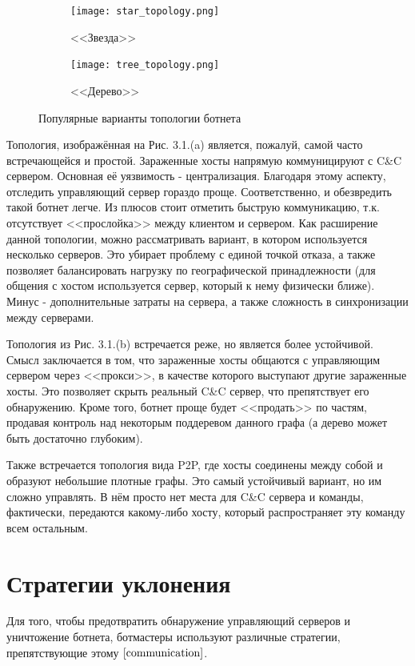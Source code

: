 \documentclass[14pt]{extreport} %
\begin{document}
\begin{figure}[H]
			
	\begin{subfigure}{0.5\textwidth}
		\texttt{[image: star\_topology.png]}
		\caption{<<Звезда>>}
		\label{fig:subim1}
	\end{subfigure}
	\begin{subfigure}{0.5\textwidth}
		\texttt{[image: tree\_topology.png]}
		\caption{<<Дерево>>}
		\label{fig:subim2}
	\end{subfigure}
			 
	\caption{Популярные варианты топологии ботнета}
	\label{fig:image2}
\end{figure}
Топология, изображённая на Рис. 3.1.(a) является, пожалуй, самой часто встречающейся и простой. Зараженные хосты напрямую коммуницируют с C\&C сервером. Основная её уязвимость - централизация. Благодаря этому аспекту, отследить управляющий сервер гораздо проще. Соответственно, и обезвредить такой ботнет легче. Из плюсов стоит отметить быструю коммуникацию, т.к. отсутствует <<прослойка>> между клиентом и сервером.
Как расширение данной топологии, можно рассматривать вариант, в котором используется несколько серверов. Это убирает проблему с единой точкой отказа, а также позволяет балансировать нагрузку по географической принадлежности (для общения с хостом используется сервер, который к нему физически ближе). Минус - дополнительные затраты на сервера, а также сложность в синхронизации между серверами.
	
Топология из Рис. 3.1.(b) встречается реже, но является более устойчивой. Смысл заключается в том, что зараженные хосты общаются с управляющим сервером через <<прокси>>, в качестве которого выступают другие зараженные хосты. Это позволяет скрыть реальный C\&C сервер, что препятствует его обнаружению. Кроме того, ботнет проще будет <<продать>> по частям, продавая контроль над некоторым поддеревом данного графа (а дерево может быть достаточно глубоким).
	
Также встречается топология вида P2P, где хосты соединены между собой и образуют небольшие плотные графы. Это самый устойчивый вариант, но им сложно управлять. В нём просто нет места для C\&C сервера и команды, фактически, передаются какому-либо хосту, который распространяет эту команду всем остальным.

	
\newpage
\section{Стратегии уклонения}
Для того, чтобы предотвратить обнаружение управляющий серверов и уничтожение ботнета, ботмастеры используют различные стратегии, препятствующие этому $\cite{communication}$.
\end{document}
